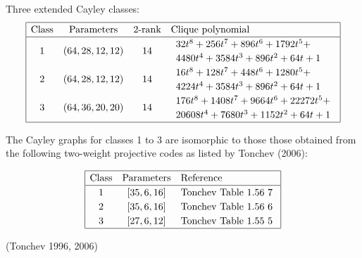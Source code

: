 \documentclass[12pt,a4paper]{article}
\newcommand{\slidecite}[1]{\tiny{(#1)}\normalsize{}}
\begin{document}
Three extended Cayley classes:
\small{}
\begin{align*}
\def\arraystretch{1.2}
\begin{array}{|cccl|}
\hline
\text{Class} &
\text{Parameters} & 
\text{2-rank} &
\text{Clique polynomial}
\\
\hline
1 &
(64, 28, 12, 12) & 14 &
\begin{array}{l}
32t^{8} + 256t^{7} + 896t^{6} + 1792t^{5} +
\\
4480t^{4} + 3584t^{3} + 896t^{2} + 64t + 1
\end{array}
\\
2 &
(64, 28, 12, 12) & 14 &
\begin{array}{l}
16t^{8} + 128t^{7} + 448t^{6} + 1280t^{5} +
\\
4224t^{4} + 3584t^{3} + 896t^{2} + 64t + 1
\end{array}
\\
3 &
(64, 36, 20, 20) & 14 &
\begin{array}{l}
176t^{8} + 1408t^{7} + 9664t^{6} + 22272t^{5} +
\\
20608t^{4} + 7680t^{3} + 1152t^{2} + 64t + 1
\end{array}
\\
\hline
\end{array}
\end{align*}

The Cayley graphs for classes 1 to 3 are isomorphic to those those obtained from the following two-weight projective
codes as listed by Tonchev (2006):

\begin{align*}
\begin{array}{|ccl|}
\hline
\text{Class} &
\text{Parameters} & \text{Reference}
\\
\hline
1 & [35,6,16] & \text{Tonchev Table 1.56 7 }
\\
2 & [35,6,16] & \text{Tonchev Table 1.56 6 }
\\
3 & [27,6,12] & \text{Tonchev Table 1.55 5 }
\\
\hline
\end{array}
\end{align*}

\slidecite{Tonchev 1996, 2006}
\end{document}
